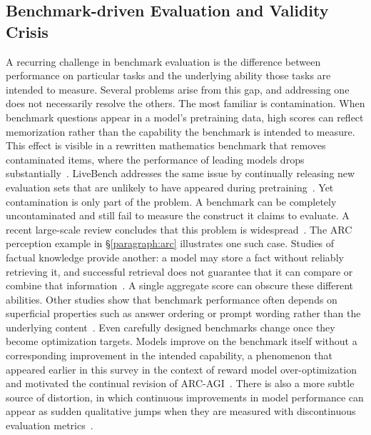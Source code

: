 \documentclass[acmsmall,screen,review,anonymous]{acmart}
\begin{document}
\subsection{Benchmark-driven Evaluation and Validity Crisis}
\label{sec:crit-benchmarks}
A recurring challenge in benchmark evaluation is the difference between performance on particular tasks and the underlying ability those tasks are intended to measure.
%
Several problems arise from this gap, and addressing one does not necessarily resolve the others. 
%
The most familiar is contamination.
%
When benchmark questions appear in a model's pretraining data, high scores can reflect memorization rather than the capability the benchmark is intended to measure.
%
This effect is visible in a rewritten mathematics benchmark that removes contaminated items, where the performance of leading models drops substantially~\citep{NEURIPS2024_53384f20}. 
%
LiveBench addresses the same issue by continually releasing new evaluation sets that are unlikely to have appeared during pretraining~\citep{white2025livebench}.
%
Yet contamination is only part of the problem.
%
A benchmark can be completely uncontaminated and still fail to measure the construct it claims to evaluate.
%
A recent large-scale review concludes that this problem is widespread~\citep{bean2026measuring}.
%
The ARC perception example in \S\ref{paragraph:arc} illustrates one such case.
%
Studies of factual knowledge provide another: a model may store a fact without reliably retrieving it, and successful retrieval does not guarantee that it can compare or combine that information~\citep{AL2023-knowledge1, AL2023-knowledge2}.
%
A single aggregate score can obscure these different abilities. 
%
Other studies show that benchmark performance often depends on superficial properties such as answer ordering or prompt wording rather than the underlying content~\citep{ICLR2024_54dd9e0c, sclar2024quantifying}. 
%
Even carefully designed benchmarks change once they become optimization targets.
%
Models improve on the benchmark itself without a corresponding improvement in the intended capability, a phenomenon that appeared earlier in this survey in the context of reward model over-optimization~\citep{gao2023scaling} and motivated the continual revision of ARC-AGI~\citep{chollet2026arcagi2newchallengefrontier}. 
%
There is also a more subtle source of distortion, in which continuous improvements in model performance can appear as sudden qualitative jumps when they are measured with discontinuous evaluation metrics~\citep{schaeffer2023emergent}.
\end{document}
